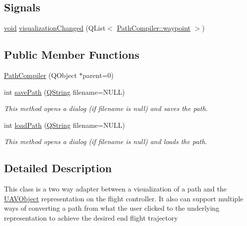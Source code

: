 \subsection*{\-Signals}
\begin{DoxyCompactItemize}
\item 
\hyperlink{group___u_a_v_objects_plugin_ga444cf2ff3f0ecbe028adce838d373f5c}{void} \hyperlink{group___o_p_map_plugin_ga9b1e292fa1cea559f4177ac8adb8d19d}{visualization\-Changed} (\-Q\-List$<$ \hyperlink{class_path_compiler_1_1waypoint}{\-Path\-Compiler\-::waypoint} $>$)
\end{DoxyCompactItemize}
\subsection*{\-Public \-Member \-Functions}
\begin{DoxyCompactItemize}
\item 
\hyperlink{group___o_p_map_plugin_ga9270b91f203f6c656318dbfb7b6f0d2d}{\-Path\-Compiler} (\-Q\-Object $\ast$parent=0)
\item 
int \hyperlink{group___o_p_map_plugin_gadd7f57ff007094b9434d1864b52c13ad}{save\-Path} (\hyperlink{group___u_a_v_objects_plugin_gab9d252f49c333c94a72f97ce3105a32d}{\-Q\-String} filename=\-N\-U\-L\-L)
\begin{DoxyCompactList}\small\item\em \-This method opens a dialog (if filename is null) and saves the path. \end{DoxyCompactList}\item 
int \hyperlink{group___o_p_map_plugin_ga6fb97167102fdadaeadd9d6686c3aea0}{load\-Path} (\hyperlink{group___u_a_v_objects_plugin_gab9d252f49c333c94a72f97ce3105a32d}{\-Q\-String} filename=\-N\-U\-L\-L)
\begin{DoxyCompactList}\small\item\em \-This method opens a dialog (if filename is null) and loads the path. \end{DoxyCompactList}\end{DoxyCompactItemize}


\subsection{\-Detailed \-Description}
\-This class is a two way adapter between a visualization of a path and the \hyperlink{class_u_a_v_object}{\-U\-A\-V\-Object} representation on the flight controller. \-It also can support multiple ways of converting a path from what the user clicked to the underlying representation to achieve the desired end flight trajectory

